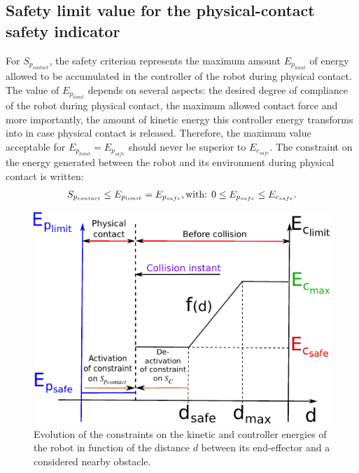\documentclass[letterpaper, 10 pt, conference]{ieeeconf}      %
\begin{document}
\subsection{Safety limit value for the physical-contact safety indicator}
For $S_{p_{contact}}$, the safety criterion represents the maximum amount $E_{p_{limit}}$ of energy allowed to be accumulated in the controller of the robot during physical contact. The value of $E_{p_{limit}}$ depends on several aspects: the desired degree of compliance of the robot during physical contact, the maximum allowed contact force and more importantly, the amount of kinetic energy this controller energy transforms into in case physical contact is released. Therefore, the maximum value acceptable for $E_{p_{limit}} = E_{p_{safe}}$ should never be superior to $E_{c_{safe}}$. The constraint on the energy generated between the robot and its environment during physical contact is written: 
\begin{equation}
\begin{split}
S_{p_{contact}} \leq E_{p_{limit}} = E_{p_{safe}}, \textnormal{with: }
0 \leq E_{p_{safe}} \leq E_{c_{safe}}.
\end{split}
\label{eq:Ep_constr_a}
\end{equation}
\begin{figure}
    \centering
	\includegraphics[width=0.92\columnwidth]{figures/niveauEnergie_graph21}
    \caption{Evolution of the constraints on the kinetic and controller energies of the robot in function of the distance $d$ between its end-effector and a considered nearby obstacle.}
    \label{fig:niveauEnergie21}
\end{figure}
\vspace{-5mm}
\end{document}
